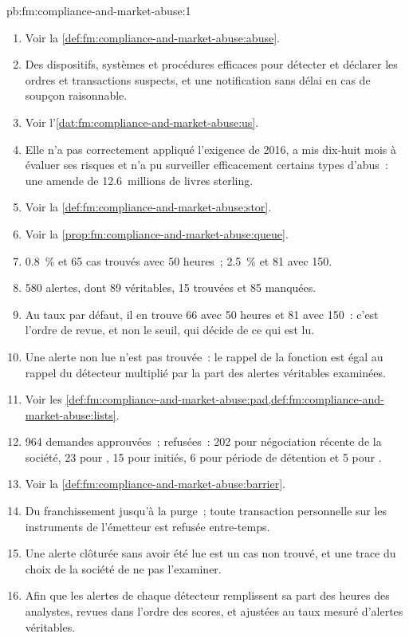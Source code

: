 \begin{solution}{pb:fm:compliance-and-market-abuse:1}
\begin{enumerate}
\item Voir la \cref{def:fm:compliance-and-market-abuse:abuse}.
\item Des dispositifs, systèmes et procédures efficaces pour détecter et déclarer les ordres et transactions suspects, et une notification sans délai en cas de
soupçon raisonnable.
\item Voir l'\cref{dat:fm:compliance-and-market-abuse:us}.
\item Elle n'a pas correctement appliqué l'exigence de 2016, a mis dix-huit mois à évaluer ses risques et n'a pu surveiller efficacement certains
types d'abus~: une amende de 12.6~millions de livres sterling.
\item Voir la \cref{def:fm:compliance-and-market-abuse:stor}.
\item Voir la \cref{prop:fm:compliance-and-market-abuse:queue}.
\item 0.8~\% et 65 cas trouvés avec 50 heures~; 2.5~\% et 81 avec 150.
\item 580 alertes, dont 89 véritables, 15 trouvées et 85 manquées.
\item Au taux par défaut, il en trouve 66 avec 50 heures et 81 avec 150~: c'est l'ordre de revue, et non le seuil, qui décide de ce qui est lu.
\item Une alerte non lue n'est pas trouvée~: le rappel de la fonction est égal au rappel du détecteur multiplié par la part des alertes véritables examinées.
\item Voir les \cref{def:fm:compliance-and-market-abuse:pad,def:fm:compliance-and-market-abuse:lists}.
\item 964 demandes approuvées~; refusées~: 202 pour négociation récente de la société, 23 pour , 15 pour initiés, 6 pour période de détention et 5 pour .
\item Voir la \cref{def:fm:compliance-and-market-abuse:barrier}.
\item Du franchissement jusqu'à la purge~; toute transaction personnelle sur les instruments de l'émetteur est refusée entre-temps.
\item Une alerte clôturée sans avoir été lue est un cas non trouvé, et une trace du choix de la société de ne pas l'examiner.
\item Afin que les alertes de chaque détecteur remplissent sa part des heures des analystes, revues dans l'ordre des scores, et ajustées au taux mesuré d'alertes véritables.

\end{enumerate}
\end{solution}
